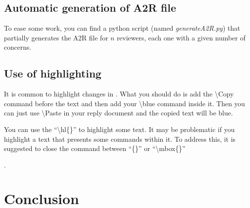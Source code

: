 \documentclass[./IEEE_Journal.tex]{subfiles}
\begin{document}
\subsection{Automatic generation of A2R file}
To ease some work, \href{https://github.com/EstebanJGC/Latex_Templates_Macros.git}{}  you can find a python script (named \textit{generateA2R.py}) that partially generates the A2R file for $n$ reviewers, each one with a given number of concerns. 

\subsection{Use of highlighting}
It is common to highlight changes in . What you should do is add the \textbackslash Copy command before the text and then add your  \textbackslash blue command inside it. Then you can just use \textbackslash Paste in your reply document and the copied text will be blue. 

You can use the ``\textbackslash hl\{\}'' to highlight some text. 
It may be problematic if you highlight a text that presents some commands within it. To address this, it is suggested to close the command between ``\{\}'' or ``\textbackslash mbox\{\}'' 

\lipsum[50].


 
\section{Conclusion}\label{sec:conclusion} 
\end{document}
